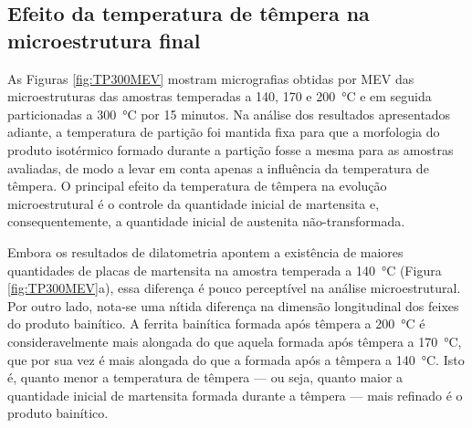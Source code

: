 \subsection{Efeito da temperatura de têmpera na microestrutura final}

\label{sec:micros_TT}

As Figuras \ref{fig:TP300MEV} mostram micrografias obtidas por MEV das microestruturas das amostras temperadas a 140, 170 e \SI{200}{\degreeCelsius} e em seguida particionadas a \SI{300}{\degreeCelsius} por 15 minutos. Na análise dos resultados apresentados adiante, a temperatura de partição foi mantida fixa para que a morfologia do produto isotérmico formado durante a partição fosse a mesma para as amostras avaliadas, de modo a levar em conta apenas a influência da temperatura de têmpera. O principal efeito da temperatura de têmpera na evolução microestrutural é o controle da quantidade inicial de martensita e, consequentemente, a quantidade inicial de austenita não-transformada.

Embora os resultados de dilatometria apontem a existência de maiores quantidades de placas de martensita na amostra temperada a \SI{140}{\degreeCelsius} (Figura \ref{fig:TP300MEV}a), essa diferença é pouco perceptível na análise microestrutural. Por outro lado, nota-se uma nítida diferença na dimensão longitudinal dos feixes do produto bainítico. A ferrita bainítica formada após têmpera a \SI{200}{\degreeCelsius} é consideravelmente mais alongada do que aquela formada após têmpera a \SI{170}{\degreeCelsius}, que por sua vez é mais alongada do que a formada após a têmpera a \SI{140}{\degreeCelsius}. Isto é, quanto menor a temperatura de têmpera --- ou seja, quanto maior a quantidade inicial de martensita formada durante a têmpera --- mais refinado é o produto bainítico.

